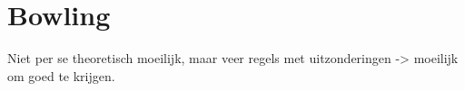 \hypertarget{bowling}{%
\section{Bowling}\label{bowling}}

Niet per se theoretisch moeilijk, maar veer regels met uitzonderingen
-\textgreater{} moeilijk om goed te krijgen.
